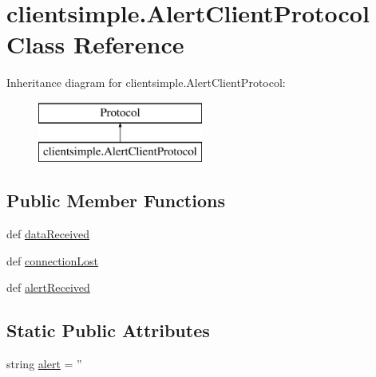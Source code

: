 \hypertarget{classclientsimple_1_1_alert_client_protocol}{\section{clientsimple.\-Alert\-Client\-Protocol Class Reference}
\label{classclientsimple_1_1_alert_client_protocol}
}
Inheritance diagram for clientsimple.\-Alert\-Client\-Protocol\-:\begin{figure}[H]
\begin{center}
\leavevmode
\includegraphics[height=2.000000cm]{classclientsimple_1_1_alert_client_protocol}
\end{center}
\end{figure}
\subsection*{Public Member Functions}
\begin{DoxyCompactItemize}
\item 
def \hyperlink{classclientsimple_1_1_alert_client_protocol_ab5758e25d1a8a3a3aedebc60e993707a}{data\-Received}
\item 
def \hyperlink{classclientsimple_1_1_alert_client_protocol_a6e14a76fc88330fd6bf638fe2e31e209}{connection\-Lost}
\item 
def \hyperlink{classclientsimple_1_1_alert_client_protocol_ab80801d12a754a9e1d0c358b798e56c3}{alert\-Received}
\end{DoxyCompactItemize}
\subsection*{Static Public Attributes}
\begin{DoxyCompactItemize}
\item 
string \hyperlink{classclientsimple_1_1_alert_client_protocol_aa51562cefc509b7022e1d23e0106dc5f}{alert} = ''
\end{DoxyCompactItemize}


